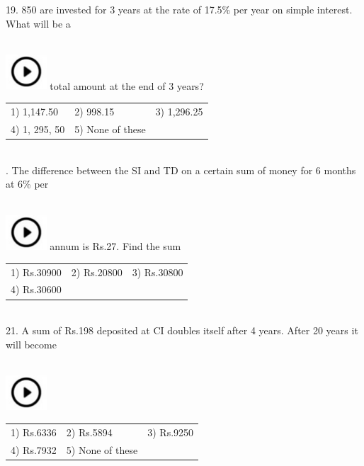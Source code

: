 \documentclass{article}
\begin{document}
	19. 850 are invested for 3 years at the rate of 17.5\% per year on simple interest. What will be a  
	 
	\noindent \\ \includegraphics*[width=0.60in, height=0.52in]{images/image1} total amount at the end of 3 years?
	
	\noindent \begin{tabular}{p{1.7in} p{1.6in} p{1.6in}} \\ 
 1) 1,147.50              & 2) 998.15          & 3) 1,296.25       \\
4) 1, 295, 50     & 5) None of these  \\
\end{tabular}
	
	\noindent 
	
	\noindent  \\ 
	
	. The difference between the SI and TD on a certain sum of money for 6 months at 6\% per
	
	\noindent  
	 
	\noindent \\ \includegraphics*[width=0.60in, height=0.52in]{images/image1} annum is Rs.27. Find the sum
	
	\noindent \begin{tabular}{p{1.7in} p{1.6in} p{1.6in}} \\ 
 1) Rs.30900              & 2) Rs.20800     & 3) Rs.30800     \\
4) Rs.30600 \\
\end{tabular}
	
	\noindent 
	
	\noindent  \\ 
	
	21. A sum of Rs.198 deposited at CI doubles itself after 4 years. After 20 years it will become  
	 
	\noindent \\ \includegraphics*[width=0.60in, height=0.52in]{images/image1}\begin{tabular}{p{1.7in} p{1.6in} p{1.6in}} \\ 
 1) Rs.6336              & 2) Rs.5894        & 3) Rs.9250        \\
4) Rs.7932       & 5) None of these  \\
\end{tabular}
	
\end{document}
